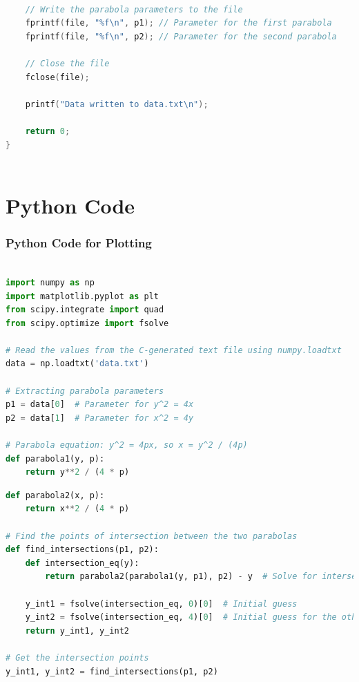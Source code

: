 \documentclass{beamer}
\theoremstyle{remark}
\numberwithin{equation}{section}
\begin{document}
\begin{frame}[fragile]
\begin{lstlisting}[language=C]

    // Write the parabola parameters to the file
    fprintf(file, "%f\n", p1); // Parameter for the first parabola
    fprintf(file, "%f\n", p2); // Parameter for the second parabola

    // Close the file
    fclose(file);

    printf("Data written to data.txt\n");

    return 0;
}
    
\end{lstlisting}
\end{frame}
\section{Python Code}
\begin{frame}[fragile]
\frametitle{Python Code for Plotting}
\begin{lstlisting}[language=Python]

import numpy as np
import matplotlib.pyplot as plt
from scipy.integrate import quad
from scipy.optimize import fsolve

# Read the values from the C-generated text file using numpy.loadtxt
data = np.loadtxt('data.txt')

# Extracting parabola parameters
p1 = data[0]  # Parameter for y^2 = 4x
p2 = data[1]  # Parameter for x^2 = 4y

# Parabola equation: y^2 = 4px, so x = y^2 / (4p)
def parabola1(y, p):
    return y**2 / (4 * p)


\end{lstlisting}
\end{frame}
\begin{frame}[fragile]
\begin{lstlisting}[language=Python]
def parabola2(x, p):
    return x**2 / (4 * p)

# Find the points of intersection between the two parabolas
def find_intersections(p1, p2):
    def intersection_eq(y):
        return parabola2(parabola1(y, p1), p2) - y  # Solve for intersection

    y_int1 = fsolve(intersection_eq, 0)[0]  # Initial guess
    y_int2 = fsolve(intersection_eq, 4)[0]  # Initial guess for the other intersection
    return y_int1, y_int2

# Get the intersection points
y_int1, y_int2 = find_intersections(p1, p2)

  
\end{lstlisting}
\end{frame}
\end{document}
